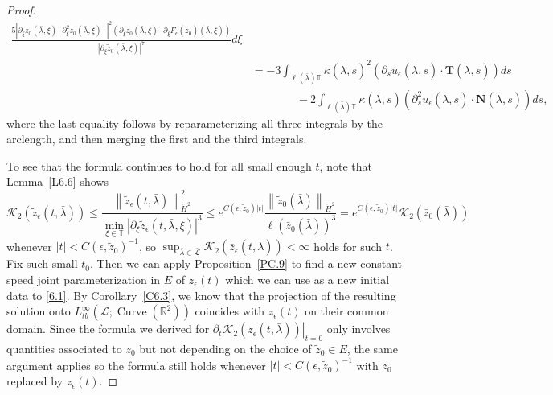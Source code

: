\documentclass[reqno,centertags,12pt]{amsart}
\theoremstyle{definition}
\numberwithin{equation}{section}
\newcommand{\abs}[1]{\left\lvert#1\right\rvert}
\newcommand{\norm}[1]{\left\|#1\right\|}
\newcommand{\bbR}{{\mathbb{R}}}
\newcommand{\bbT}{{\mathbb{T}}}
\begin{document}
\begin{proof}
\begin{align*}
        \frac{5\abs{\partial_{\xi}\tilde{z}_{0}(\bar{\lambda},\xi)\cdot
        \partial_{\xi}^{2}\tilde{z}_{0}(\bar{\lambda},\xi)^{\perp}}^{2}
        \left(
            \partial_{\xi}\tilde{z}_{0}(\bar{\lambda},\xi)
            \cdot\partial_{\xi}F_{\epsilon}(\tilde{z}_{0})(\bar{\lambda},\xi)
        \right)}
        {\abs{\partial_{\xi}\tilde{z}_{0}(\bar{\lambda},\xi)}^{7}}
        d\xi \\
        &=
        -3\int_{\ell(\bar{\lambda})\bbT}
        \kappa(\bar{\lambda},s)^{2}
        \left(\partial_{s}u_{\epsilon}(\bar{\lambda},s)\cdot
        \mathbf{T}(\bar{\lambda},s)\right)ds \\
        &\quad\quad\quad\quad
        - 2\int_{\ell(\bar{\lambda})\bbT}
        \kappa(\bar{\lambda},s)
        \left(\partial_{s}^{2}u_{\epsilon}(\bar{\lambda},s)\cdot
        \mathbf{N}(\bar{\lambda},s)\right)ds,
    \end{align*}
    where the last equality follows by reparameterizing all three integrals by
    the arclength, and then merging the first and the third integrals.

    To see that the formula continues to hold for all small enough $t$,
    note that Lemma~\ref{L6.6} shows
    \[
        \mathcal{K}_{2}(\tilde{z}_{\epsilon}(t,\bar{\lambda}))
        \leq \frac{\norm{\tilde{z}_{\epsilon}(t,\bar{\lambda})}_{\dot{H}^{2}}^{2}}
        {\min_{\xi\in\bbT}\abs{\partial_{\xi}\tilde{z}_{\epsilon}(t,\bar{\lambda},\xi)}^{3}}
        \leq e^{C(\epsilon,\tilde{z}_{0})\abs{t}}
        \frac{\norm{\tilde{z}_{0}(\bar{\lambda})}_{\dot{H}^{2}}}
        {\ell(\bar{z}_{0}(\bar{\lambda}))^{3}}
        = e^{C(\epsilon,\tilde{z}_{0})\abs{t}}
        \mathcal{K}_{2}(\bar{z}_{0}(\bar{\lambda}))
    \]
    whenever $\abs{t}<C(\epsilon,\tilde{z}_{0})^{-1}$, so
    $\sup_{\bar{\lambda}\in\bar{\mathcal{L}}}
    \mathcal{K}_{2}(\bar{z}_{\epsilon}(t,\bar{\lambda})) < \infty$ holds for such $t$.
    Fix such small $t_{0}$. Then we can apply Proposition~\ref{PC.9} to find
    a new constant-speed joint parameterization in $E$ of $z_{\epsilon}(t)$
    which we can use as a new initial data to \eqref{6.1}.
    By Corollary~\ref{C6.3},
    we know that the projection of the resulting solution
    onto $L_{tb}^{\infty}(\mathcal{L};\operatorname{Curve}(\bbR^{2}))$
    coincides with $z_{\epsilon}(t)$ on their common domain.
    Since the formula we derived for
    $\left.\partial_{t}\mathcal{K}_{2}(\bar{z}_{\epsilon}(t,\bar{\lambda}))\right|_{t=0}$
    only involves quantities associated to $z_{0}$
    but not depending on the choice of $\tilde{z}_{0}\in E$,
    the same argument applies so the formula still holds whenever
    $\abs{t}<C(\epsilon,\tilde{z}_{0})^{-1}$ with $z_{0}$ replaced by $z_{\epsilon}(t)$.
\end{proof}
\end{document}
